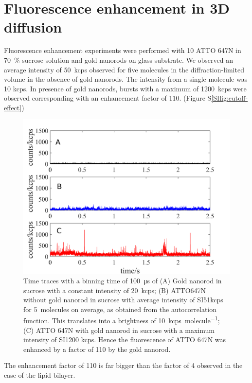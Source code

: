 \documentclass[11pt,a4paper,onecolumn]{article}
\begin{document}
\section{Fluorescence enhancement in 3D diffusion}
Fluorescence enhancement experiments were performed with \SI{10}{\nM} ATTO 647N in \SI{70}{\percent} sucrose solution and gold nanorods on glass substrate.
We observed an average intensity of \SI{50}{kcps} observed for five molecules in the diffraction-limited volume in the absence of gold nanorods.
The intensity from a single molecule was 10 kcps.
In presence of gold nanorods, bursts with a maximum of \SI{1200}{kcps} were observed corresponding with an enhancement factor of 110. (Figure S\ref{SIfig:cutoff-effect})\\
\begin{figure}[ht]
  \centering
  \includegraphics[width=\textwidth]{3D_enhc.png}
  \makeatletter
  \renewcommand{\fnum@figure}{\figurename~S\thefigure}
  \makeatother{}
  \caption{Time traces with a binning time of \SI{100}{\us} of (A) Gold nanorod in sucrose with a constant intensity of \SI{20}{kcps}; (B) ATTO647N without gold nanorod in sucrose with average intensity of SI{51}{kcps} for \SI{5}{ molecules} on average, as obtained from the autocorrelation function.
  This translates into a brightness of \SI{10}{ kcps\per molecule}; (C) ATTO 647N with gold nanorod in sucrose with a maximum intensity of SI{1200}{ kcps}.
  Hence the fluorescence of ATTO 647N was enhanced by a factor of 110 by the gold nanorod.}
  \label{SIfig:3D-enhc}
\end{figure}
The enhancement factor of 110 is far bigger than the factor of 4 observed in the case of the lipid bilayer. 
\end{document}

